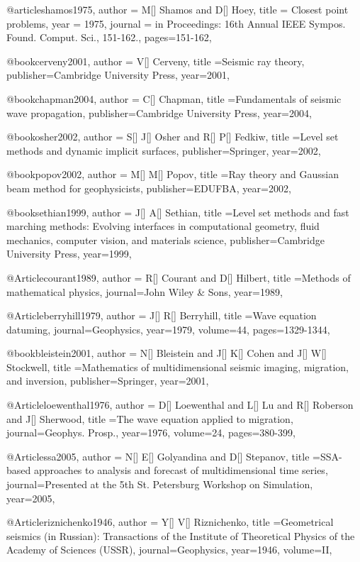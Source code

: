 {@article{shamos1975,
  author =	 {M[] Shamos and D[] Hoey},
  title =	 {Closest point problems},
  year =	 1975,
  journal =	 {in Proceedings: 16th Annual IEEE Sympos. Found. Comput. Sci., 151-162.},
  pages=151-162,
}

@book{cerveny2001,
  author = {V[] Cerveny},
  title ={Seismic ray theory},
  publisher={Cambridge University Press},
  year=2001,
}

@book{chapman2004,
  author = {C[] Chapman},
  title ={Fundamentals of seismic wave propagation},
  publisher={Cambridge University Press},
  year=2004,
}

@book{osher2002,
  author = {S[] J[] Osher and R[] P[] Fedkiw},
  title ={Level set methods and dynamic implicit surfaces},
  publisher={Springer},
  year=2002,
}

@book{popov2002,
  author = {M[] M[] Popov},
  title ={Ray theory and Gaussian beam method for geophysicists},
  publisher={EDUFBA},
  year=2002,
}

@book{sethian1999,
  author = {J[] A[] Sethian},
  title ={Level set methods and fast marching methods: Evolving interfaces in computational geometry, fluid mechanics, computer vision, and materials science},
  publisher={Cambridge University Press},
  year=1999,
}

@Article{courant1989,
  author = {R[] Courant and D[] Hilbert},
  title ={Methods of mathematical physics},
  journal={John Wiley \& Sons},
  year=1989,
}

@Article{berryhill1979,
  author = {J[] R[] Berryhill},
  title ={Wave equation datuming},
  journal={Geophysics},
  year=1979,
  volume=44,
  pages={1329-1344},
}

@book{bleistein2001,
  author = {N[] Bleistein and J[] K[] Cohen and J[] W[] Stockwell},
  title ={Mathematics of multidimensional seismic imaging, migration, and inversion},
  publisher={Springer},
  year=2001,
}

@Article{loewenthal1976,
  author = {D[] Loewenthal and L[] Lu and R[] Roberson and J[] Sherwood},
  title ={The wave equation applied to migration},
  journal={Geophys. Prosp.},
  year=1976,
  volume=24,
  pages={380-399},
}

@Article{ssa2005,
  author = {N[] E[] Golyandina and D[] Stepanov},
  title ={SSA-based approaches to analysis and forecast of multidimensional time series},
  journal={Presented at the 5th St. Petersburg Workshop on Simulation},
  year=2005,
}



@Article{riznichenko1946,
  author = {Y[] V[] Riznichenko},
  title ={Geometrical seismics (in Russian): Transactions of the Institute of Theoretical Physics of the Academy of Sciences (USSR)},
  journal={Geophysics},
  year=1946,
  volume=II,
}

}
